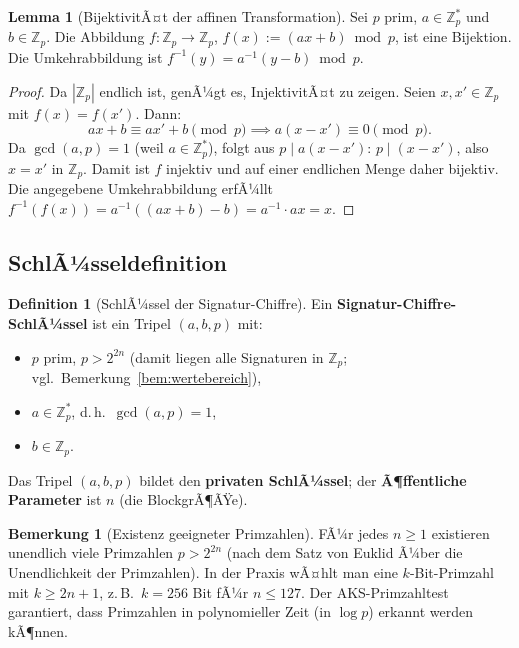 ﻿\documentclass[a4paper,12pt]{scrreprt}
\theoremstyle{definition}
\newtheorem{definition}{Definition}[section]
\newtheorem{bemerkung}{Bemerkung}[section]
\newtheorem{lemma}{Lemma}[section]
\begin{document}
\begin{lemma}[BijektivitÃ¤t der affinen Transformation]
	\label{lem:affin-bij}
	Sei $p$ prim, $a \in \mathbb{Z}_p^*$ und $b \in \mathbb{Z}_p$. Die Abbildung $f: \mathbb{Z}_p \to \mathbb{Z}_p$, $f(x) := (ax + b) \bmod p$, ist eine Bijektion. Die Umkehrabbildung ist $f^{-1}(y) = a^{-1}(y - b) \bmod p$.
\end{lemma}

\begin{proof}
	Da $|{\mathbb{Z}_p}|$ endlich ist, genÃ¼gt es, InjektivitÃ¤t zu zeigen. Seien $x, x' \in \mathbb{Z}_p$ mit $f(x) = f(x')$. Dann:
	\[
	ax + b \equiv ax' + b \pmod{p} \implies a(x - x') \equiv 0 \pmod{p}.
	\]
	Da $\gcd(a, p) = 1$ (weil $a \in \mathbb{Z}_p^*$), folgt aus $p \mid a(x-x')$: $p \mid (x - x')$, also $x = x'$ in $\mathbb{Z}_p$. Damit ist $f$ injektiv und auf einer endlichen Menge daher bijektiv. Die angegebene Umkehrabbildung erfÃ¼llt $f^{-1}(f(x)) = a^{-1}((ax+b) - b) = a^{-1} \cdot ax = x$.
\end{proof}

\subsection{SchlÃ¼sseldefinition}

\begin{definition}[SchlÃ¼ssel der Signatur-Chiffre]
	\label{def:schluessel}
	Ein \textbf{Signatur-Chiffre-SchlÃ¼ssel} ist ein Tripel $(a, b, p)$ mit:
	\begin{itemize}
		\item $p$ prim, $p > 2^{2n}$ (damit liegen alle Signaturen in $\mathbb{Z}_p$; vgl.\ Bemerkung~\ref{bem:wertebereich}),
		\item $a \in \mathbb{Z}_p^*$, d.\,h.\ $\gcd(a, p) = 1$,
		\item $b \in \mathbb{Z}_p$.
	\end{itemize}
	Das Tripel $(a, b, p)$ bildet den \textbf{privaten SchlÃ¼ssel}; der \textbf{Ã¶ffentliche Parameter} ist $n$ (die BlockgrÃ¶ÃŸe).
\end{definition}

\begin{bemerkung}[Existenz geeigneter Primzahlen]
	FÃ¼r jedes $n \geq 1$ existieren unendlich viele Primzahlen $p > 2^{2n}$ (nach dem Satz von Euklid Ã¼ber die Unendlichkeit der Primzahlen). In der Praxis wÃ¤hlt man eine $k$-Bit-Primzahl mit $k \geq 2n + 1$, z.\,B.\ $k = 256$ Bit fÃ¼r $n \leq 127$. Der AKS-Primzahltest \cite{AKS04} garantiert, dass Primzahlen in polynomieller Zeit (in $\log p$) erkannt werden kÃ¶nnen.
\end{bemerkung}
\end{document}
